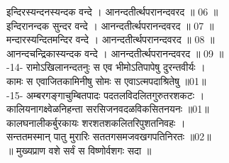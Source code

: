 इन्दिरस्यन्दनस्यन्दक वन्दे । आनन्दतीर्त्थपरानन्दवरद ॥ 06 ॥\\
इन्दिरानन्दक सुन्दर वन्दे । आनन्दतीर्त्थपरानन्दवरद ॥ 07 ॥\\
मन्दारस्यन्दितमन्दिर वन्दे । आनन्दतीर्त्थपरानन्दवरद ॥ 08 ॥\\
आनन्दचन्द्रिकास्यन्दक वन्दे । आनन्दतीर्त्थपरानन्दवरद ॥ 09 ॥\\
-14-
रामोऽखिलानन्दतनुः स एव भीमोऽतिपापेषु दुरन्तवीर्यः ।\\
कामः स एवाजितकामिनीषु सोमः स एवाऽत्मपदाश्रितेषु ॥01॥\\
 -15-
अम्बरगङ्गाचुम्बितपादः पदतलविदलितगुरुतरशकटः ।\\
कालियनागक्ष्वेळनिहन्ता सरसिजनवदळविकसितनयनः ॥01॥\\
 कालघनालीकर्बुरकायः शरशतशकलितरिपुशतनिवहः ।\\
सन्ततमस्मान् पातु मुरारिः सततगसमजवखगपतिनिरतः ॥02॥\\
 ॥ मुख्यप्राण वशे सर्वं स विष्णोर्वशगः सदा ॥\\
